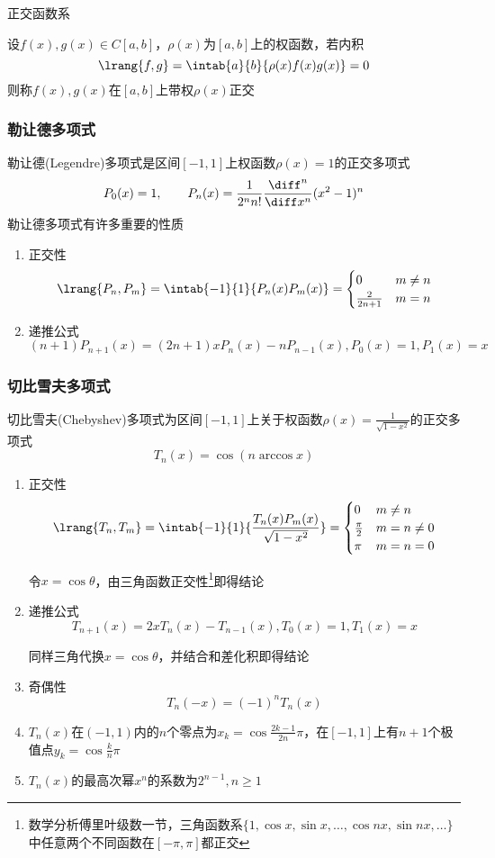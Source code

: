 正交函数系
\begin{definition}[正交]
    设$f(x),g(x)\in C[a,b]$，$\rho(x)$为$[a,b]$上的权函数，若内积
    \[\lrang{f,g}=\intab{a}{b}{\rho(x)f(x)g(x)}=0\]
    则称$f(x),g(x)$在$[a,b]$上带权$\rho(x)$正交
\end{definition}

\subsubsection{勒让德多项式}
勒让德(Legendre)多项式是区间$[-1,1]$上权函数$\rho(x)=1$的正交多项式
\[P_0(x)=1,\qquad P_n(x)=\frac{1}{2^nn!}\frac{\diff^n}{\diff x^n}(x^2-1)^n\]
勒让德多项式有许多重要的性质
\begin{enumerate}
    \item 正交性
\[\lrang{P_n,P_m}=\intab{-1}{1}{P_n(x)P_m(x)}=\begin{cases}0&m\ne n\\\frac{2}{2n+1}&m=n\end{cases}\]
    \item 递推公式
    \[(n+1)P_{n+1}(x)=(2n+1)xP_n(x)-nP_{n-1}(x),P_0(x)=1,P_1(x)=x\]
\end{enumerate}

\subsubsection{切比雪夫多项式}
切比雪夫(Chebyshev)多项式为区间$[-1,1]$上关于权函数$\rho(x)=\frac{1}{\sqrt{1-x^2}}$的正交多项式
\[T_n(x)=\cos(n\arccos x)\]
\begin{enumerate}
    \item 正交性
\[\lrang{T_n,T_m}=\intab{-1}{1}{\frac{T_n(x)P_m(x)}{\sqrt{1-x^2}}}=\begin{cases}0&m\ne n\\\frac{\pi}{2}&m=n\ne 0\\\pi&m=n=0\end{cases}\]
    \begin{analysis}
        令$x=\cos\theta$，由三角函数正交性\footnote{数学分析傅里叶级数一节，三角函数系$\{1,\cos x,\sin x,\ldots,\cos nx,\sin nx,\ldots\}$中任意两个不同函数在$[-\pi,\pi]$都正交}即得结论
    \end{analysis}
    \item 递推公式
\[T_{n+1}(x)=2xT_n(x)-T_{n-1}(x),T_0(x)=1,T_1(x)=x\]
\begin{analysis}
    同样三角代换$x=\cos\theta$，并结合和差化积即得结论
\end{analysis}
    \item 奇偶性
\[T_n(-x)=(-1)^nT_n(x)\]
    \item $T_n(x)$在$(-1,1)$内的$n$个零点为$x_k=\cos\frac{2k-1}{2n}\pi$，在$[-1,1]$上有$n+1$个极值点$y_k=\cos\frac{k}{n}\pi$
    \item $T_n(x)$的最高次幂$x^n$的系数为$2^{n-1},n\geq 1$
\end{enumerate}

